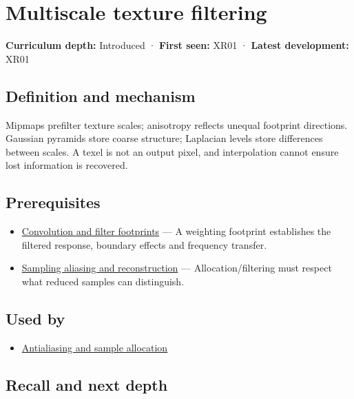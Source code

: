 \hypertarget{appendix-b677a85ba76f}{}\label{referencestart:appendix-b677a85ba76f}
\section{Multiscale texture filtering}\label{appendix-b677a85ba76f-multiscale-texture-filtering}

\textbf{Curriculum depth:} Introduced · \textbf{First seen:} XR01 · \textbf{Latest development:} XR01

\subsection{Definition and mechanism}\label{appendix-b677a85ba76f-definition-and-mechanism}

Mipmaps prefilter texture scales; anisotropy reflects unequal footprint directions. Gaussian pyramids store coarse structure; Laplacian levels store differences between scales. A texel is not an output pixel, and interpolation cannot ensure lost information is recovered.

\subsection{Prerequisites}\label{appendix-b677a85ba76f-prerequisites}

\begin{itemize}
\tightlist
\item
  \hyperref[appendix-d5b3c692d9f0]{Convolution and filter footprints} --- A weighting footprint establishes the filtered response, boundary effects and frequency transfer.
\item
  \hyperref[appendix-6a7869dd79a6]{Sampling aliasing and reconstruction} --- Allocation/filtering must respect what reduced samples can distinguish.
\end{itemize}

\subsection{Used by}\label{appendix-b677a85ba76f-used-by}

\begin{itemize}
\tightlist
\item
  \hyperref[appendix-4192b2bdd21e]{Antialiasing and sample allocation}
\end{itemize}

\subsection{Recall and next depth}\label{appendix-b677a85ba76f-recall-and-next-depth}

